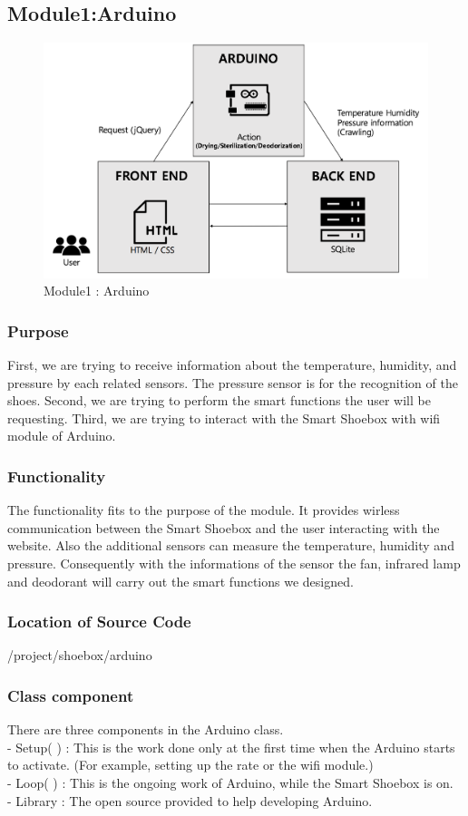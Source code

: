 \documentclass[conference]{IEEEtran}
\begin{document}
\subsection{Module1:Arduino}
\begin{figure}[h]
\begin{center}
    \includegraphics[scale=0.33]{module1}
    \caption{Module1 : Arduino} \label{fig:label}
\end{center}
\end{figure}
\subsubsection{Purpose} First, we are trying to receive information about the temperature, humidity, and pressure by each related sensors. The pressure sensor is for the recognition of the shoes. Second, we are trying to perform the smart functions the user will be requesting. Third, we are trying to interact with the Smart Shoebox with wifi module of Arduino.
\subsubsection{Functionality} The functionality fits to the purpose of the module. It provides wirless communication between the Smart Shoebox and the user interacting with the website. Also the additional sensors can measure the temperature, humidity and pressure. Consequently with the informations of the sensor the fan, infrared lamp and deodorant will carry out the smart functions we designed.
\subsubsection{Location of Source Code}/project/shoebox/arduino
\subsubsection{Class component}There are three components in the Arduino class.
\\
- Setup( ) : This is the work done only at the first time when the Arduino starts to activate. 
(For example, setting up the rate or the wifi module.)
\\
- Loop( ) : This is the ongoing work of Arduino, while the Smart Shoebox is on.
\\
- Library : The open source provided to help developing Arduino.
\end{document}
